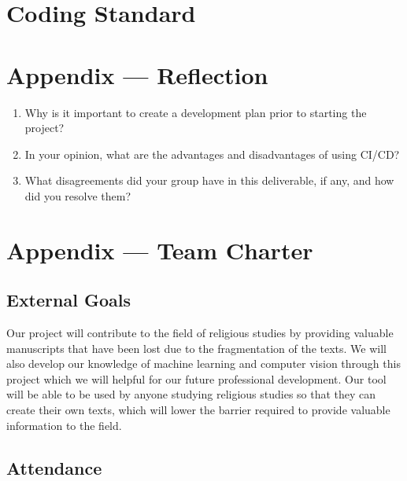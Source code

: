 \documentclass{article}
\begin{document}

\section{Coding Standard}


\newpage{}

\section*{Appendix --- Reflection}




\begin{enumerate}
    \item Why is it important to create a development plan prior to starting the
    project?
    \item In your opinion, what are the advantages and disadvantages of using
    CI/CD?
    \item What disagreements did your group have in this deliverable, if any,
    and how did you resolve them?
\end{enumerate}

\newpage{}

\section*{Appendix --- Team Charter}


\subsection*{External Goals}

Our project will contribute to the field of religious studies by providing valuable manuscripts that have been lost due to the fragmentation of the texts. We will also develop our knowledge 
of machine learning and computer vision through this project which we will helpful for our future professional development. Our tool will be able to be used by anyone studying 
religious studies so that they can create their own texts, which will lower the barrier required to provide valuable information to the field.

\subsection*{Attendance}
\end{document}
